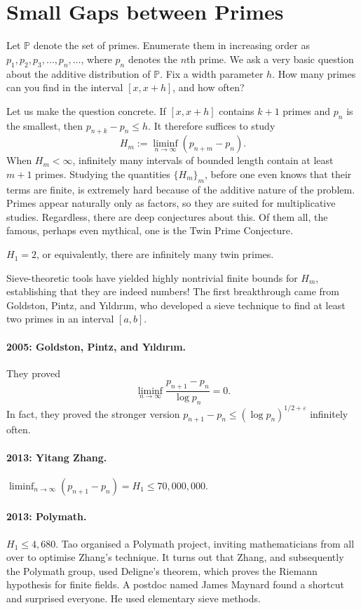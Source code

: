 \documentclass[11pt,a4paper]{article}
\begin{document}
\section*{Small Gaps between Primes}
Let $\mathbb P$ denote the set of primes. Enumerate them in increasing
order as $p_1,p_2,p_3,\ldots,p_n,\ldots$, where $p_n$ denotes the $n$th prime.
We ask a very basic question about the additive distribution of $\mathbb P$.
Fix a width parameter $h$. How many primes can you find in the interval
$[x,x+h]$, and how often?

Let us make the question concrete. If $[x,x+h]$ contains $k+1$ primes and $p_n$ is the smallest, then $p_{n+k}-p_n\le h$.
It therefore suffices to study
\[H_m:=\liminf_{n\to\infty}(p_{n+m}-p_n).\]
When $H_m<\infty$, infinitely many intervals of bounded length contain at least $m+1$ primes.
Studying the quantities $\{H_m\}_m$, before one even knows that their terms are finite, is extremely hard because of the additive nature of the problem.
Primes appear naturally only as factors, so they are suited for
multiplicative studies. Regardless, there are deep conjectures about this.
Of them all, the famous, perhaps even mythical, one is the
Twin Prime Conjecture.
\setcounter{theorem}{17}\begin{conjecture}
$H_1=2$, or equivalently, there are infinitely many twin primes.
\end{conjecture}
Sieve-theoretic tools have yielded highly nontrivial finite bounds for $H_m$,
establishing that they are indeed numbers!
The first breakthrough came from Goldston, Pintz, and Y{\i}ld{\i}r{\i}m,
who developed a sieve technique to find at least two primes in an interval
$[a,b]$.
\paragraph{2005: Goldston, Pintz, and Y{\i}ld{\i}r{\i}m.}
They proved
\[
 \liminf_{n\to\infty}\frac{p_{n+1}-p_n}{\log p_n}=0.
\]
In fact, they proved the stronger version
$p_{n+1}-p_n\le(\log p_n)^{1/2+\varepsilon}$ infinitely often.
\paragraph{2013: Yitang Zhang.}
$\liminf_{n\to\infty}(p_{n+1}-p_n)=H_1\le70{,}000{,}000$.
\paragraph{2013: Polymath.}
$H_1\le4{,}680$. Tao organised a Polymath project, inviting mathematicians
from all over to optimise Zhang's technique.
It turns out that Zhang, and subsequently the Polymath group, used
Deligne's theorem, which proves the Riemann hypothesis for finite fields.
A postdoc named James Maynard found a shortcut and surprised everyone.
He used elementary sieve methods.
\end{document}
